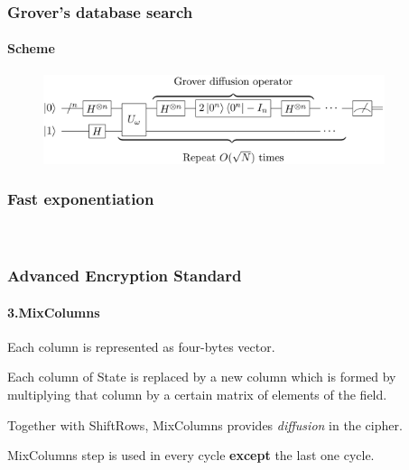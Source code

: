 \begin{frame}
	\frametitle{Grover's database search}
		\framesubtitle{Scheme}
	\vspace{0.5cm}
		\begin{figure}
		\centering
		\includegraphics[width=10cm]{grdiffusion}
		\label{fig:grdiffusion grdiffusion}
	\end{figure}
\end{frame}

\begin{frame}
	\frametitle{Fast exponentiation}
		\framesubtitle{}

		{\normalsize
		\\
		}
		

\end{frame}

\begin{frame}
	\frametitle{Advanced Encryption Standard}
		\framesubtitle{3.MixColumns}
		\vfill
	
	\begin{block}{}
    	{Each column is represented as four-bytes vector.}\\
    \end{block}
    \begin{block}{}
		{Each column of State is replaced by a new column which is formed by multiplying that column by a certain 			matrix of elements of the field.}\\	
	\end{block}	
	    \begin{block}{}
		{Together with ShiftRows, MixColumns provides \textit{diffusion} in the cipher.}\\	
	\end{block}
		\begin{alertblock}{}
		{MixColumns step is used in every cycle \textbf{except} the last one cycle.}\\
		\end{alertblock}
\end{frame}

